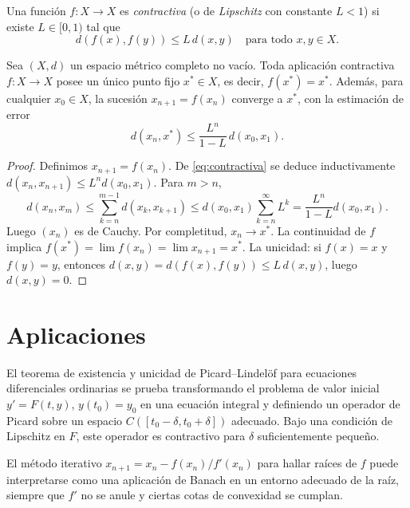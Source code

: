 \begin{definition}
\label{def:contractiva}
Una función $f\colon X\to X$ es \emph{contractiva} (o de \emph{Lipschitz} con constante $L<1$) si existe $L\in[0,1)$ tal que
\begin{equation}\label{eq:contractiva}
  d(f(x),f(y))\leq L\,d(x,y)\quad\text{para todo }x,y\in X.
\end{equation}
\end{definition}

\begin{theorem}
\label{teo:banach}
Sea $(X,d)$ un espacio métrico completo no vacío. Toda aplicación contractiva $f\colon X\to X$ posee un único punto fijo $x^*\in X$, es decir, $f(x^*)=x^*$. Además, para cualquier $x_0\in X$, la sucesión $x_{n+1}=f(x_n)$ converge a $x^*$, con la estimación de error
\begin{equation}\label{eq:error-banach}
  d(x_n,x^*)\leq\frac{L^n}{1-L}\,d(x_0,x_1).
\end{equation}
\end{theorem}
\begin{proof}
Definimos $x_{n+1}=f(x_n)$. De \eqref{eq:contractiva} se deduce inductivamente $d(x_n,x_{n+1})\leq L^n d(x_0,x_1)$. Para $m>n$,
\[
  d(x_n,x_m)\leq\sum_{k=n}^{m-1}d(x_k,x_{k+1})\leq d(x_0,x_1)\sum_{k=n}^{\infty}L^k=\frac{L^n}{1-L}d(x_0,x_1).
\]
Luego $(x_n)$ es de Cauchy. Por completitud, $x_n\to x^*$. La continuidad de $f$ implica $f(x^*)=\lim f(x_n)=\lim x_{n+1}=x^*$. La unicidad: si $f(x)=x$ y $f(y)=y$, entonces $d(x,y)=d(f(x),f(y))\leq L\,d(x,y)$, luego $d(x,y)=0$.
\end{proof}

\section{Aplicaciones}

\begin{example}
\label{ej:edo-banach}
El teorema de existencia y unicidad de Picard--Lindelöf para ecuaciones diferenciales ordinarias se prueba transformando el problema de valor inicial $y'=F(t,y)$, $y(t_0)=y_0$ en una ecuación integral y definiendo un operador de Picard sobre un espacio $C([t_0-\delta,t_0+\delta])$ adecuado. Bajo una condición de Lipschitz en $F$, este operador es contractivo para $\delta$ suficientemente pequeño.
\end{example}

\begin{example}
\label{ej:newton}
El método iterativo $x_{n+1}=x_n-f(x_n)/f'(x_n)$ para hallar raíces de $f$ puede interpretarse como una aplicación de Banach en un entorno adecuado de la raíz, siempre que $f'$ no se anule y ciertas cotas de convexidad se cumplan.
\end{example}

